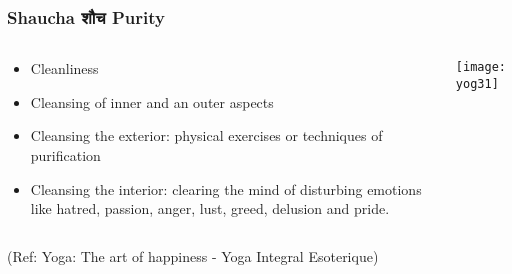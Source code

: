 \begin{frame}[fragile]\frametitle{Shaucha शौच Purity }
   \begin{columns}
    \begin{column}[t]{0.7\linewidth}
	
	\begin{itemize}
	\item Cleanliness
	\item Cleansing of  inner and an outer aspects
	\item Cleansing the exterior: physical exercises or techniques of purification 
	\item Cleansing the interior: clearing the mind of disturbing emotions like hatred, passion, anger, lust, greed, delusion and pride.

	\end{itemize}
	    \end{column}
    \begin{column}[t]{0.3\linewidth}
\begin{center}
\texttt{[image: yog31]}

\end{center}
    \end{column}
  \end{columns}
  
  \tiny{(Ref: Yoga: The art of happiness - Yoga Integral Esoterique)}

\end{frame}



